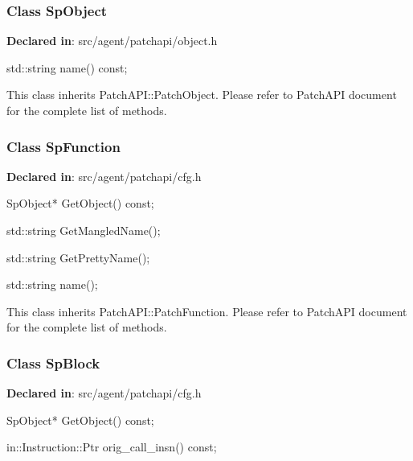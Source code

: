 \subsubsection{Class SpObject}
\textbf{Declared in}: src/agent/patchapi/object.h

\begin{apient}
std::string name() const;
\end{apient}

This class inherits PatchAPI::PatchObject. Please refer to PatchAPI document for
the complete list of methods.

\subsubsection{Class SpFunction}
\textbf{Declared in}: src/agent/patchapi/cfg.h

\begin{apient}
SpObject* GetObject() const;
\end{apient}


\begin{apient}
std::string GetMangledName();
\end{apient}

\begin{apient}
std::string GetPrettyName();
\end{apient}

\begin{apient}
std::string name();
\end{apient}

This class inherits PatchAPI::PatchFunction. Please refer to PatchAPI document
for the complete list of methods.

\subsubsection{Class SpBlock}
\textbf{Declared in}: src/agent/patchapi/cfg.h

\begin{apient}
SpObject* GetObject() const;
\end{apient}


\begin{apient}
in::Instruction::Ptr orig_call_insn() const;
\end{apient}

